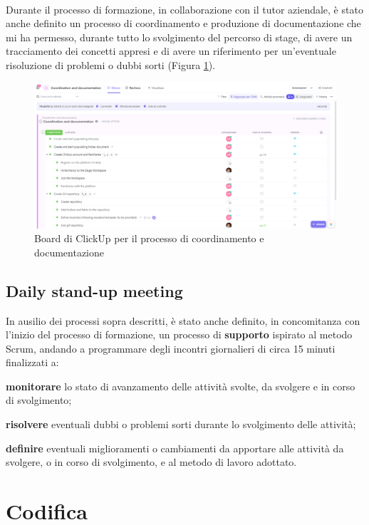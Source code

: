 \\
Durante il processo di formazione, in collaborazione con il tutor aziendale, è stato anche definito un processo di coordinamento e produzione di 
documentazione che mi ha permesso, durante tutto lo svolgimento del percorso di stage, di avere un tracciamento dei concetti appresi e 
 di avere un riferimento per un'eventuale risoluzione di problemi o dubbi sorti (Figura \ref{cap:Documentazione}).
\begin{figure}[h]
    \centering
    \includegraphics[width=1\textwidth]{images/percorso/coordinamento.png}
    \caption{Board di ClickUp per il processo di coordinamento e documentazione}
    \label{cap:Documentazione}
\end{figure}
\subsection{Daily stand-up meeting}
In ausilio dei processi sopra descritti, 
è stato anche definito, in concomitanza con l'inizio del processo di formazione, un processo di \textbf{supporto} ispirato al metodo \gls{Scrum}{}, 
andando a programmare degli incontri giornalieri di circa 15 minuti finalizzati a:
\begin{list}{*}
    \item \textbf{monitorare} lo stato di avanzamento delle attività svolte, da svolgere e in corso di svolgimento;
    \item \item \textbf{risolvere} eventuali dubbi o problemi sorti durante lo svolgimento delle attività;
    \item \textbf{definire} eventuali miglioramenti o cambiamenti da apportare alle attività da svolgere, o in corso di svolgimento, e al metodo 
    di lavoro adottato.
\end{list}
\section{Codifica}
